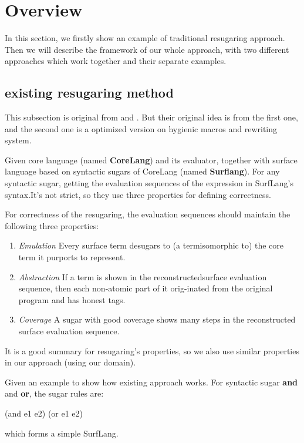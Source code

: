 \section{Overview}
\label{sec2}
In this section, we firstly show an example of traditional resugaring approach. Then we will describe the framework of our whole approach, with two different approaches which work together and their separate examples.
\subsection{existing resugaring method}
This subsection is original from \cite{resugaring} and \cite{hygienic}. But their original idea is from the first one, and the second one is a optimized version on hygienic macros and rewriting system.
\begin{Def}[Resugaring]
Given core language (named {\bfseries CoreLang}) and its evaluator, together with surface language based on syntactic sugars of CoreLang (named {\bfseries Surflang}). For any syntactic sugar, getting the evaluation sequences of the expression in SurfLang's syntax.It's not strict, so they use three properties for defining correctness.
\end{Def}
For correctness of the resugaring, the evaluation sequences should maintain the following three properties:
\begin{enumerate}
\item \emph{Emulation} Every surface term desugars to (a termisomorphic to) the core term it purports to represent.
\item \emph{Abstraction} If a term is shown in the reconstructedsurface evaluation sequence, then each non-atomic part of it orig-inated from the original program and has honest tags.
\item \emph{Coverage}  A sugar with good coverage shows many steps in the reconstructed surface evaluation sequence.
\end{enumerate}
It is a good summary for resugaring's properties, so we also use similar properties in our approach (using our domain).

Given an example to show how existing approach works. For syntactic sugar {\bfseries and} and {\bfseries or}, the sugar rules are:
\begin{Codes}
(and e1 e2)     \hfill (or e1 e2)  
\end{Codes}
which forms a simple SurfLang.

